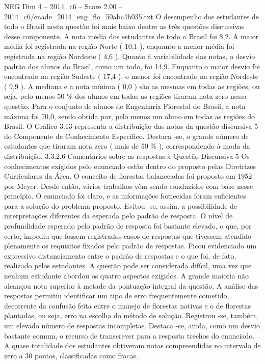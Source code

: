 \begin{textsample}{NEG Dim 4 – 2014\_c6 – Score 2.00 – 2014\_c6/enade\_2014\_eng\_flo\_50abc4b035.txt}
O desempenho dos estudantes de todo o Brasil nesta questão foi mais baixo dentre as três questões discursivas desse componente.
A nota média dos estudantes de todo o Brasil foi 8,2.
A maior média foi registrada na região Norte ( 10,1 ), enquanto a menor média foi registrada na região Nordeste ( 4,6 ).
Quanto à variabilidade das notas, o desvio padrão dos alunos do Brasil, como um todo, foi 14,9.
Enquanto o maior desvio foi encontrado na região Sudeste ( 17,4 ), o menor foi encontrado na região Nordeste ( 9,9 ).
A mediana e a nota mínima ( 0,0 ) são as mesmas em todas as regiões, ou seja, pelo menos 50 \% dos alunos em todas as regiões tiraram nota zero nessa questão.
Para o conjunto de alunos de Engenharia Florestal do Brasil, a nota máxima foi 70,0, sendo obtida por, pelo menos um aluno em todas as regiões do Brasil.
O Gráfico 3.13 representa a distribuição das notas da questão discursiva 5 do Componente de Conhecimento Específico.
Destaca -se, o grande número de estudantes que tiraram nota zero ( mais de 50 \% ), correspondendo à moda da distribuição. 3.3.2.6 Comentários sobre as respostas à Questão Discursiva 5 Os conhecimentos exigidos pelo enunciado estão dentro do proposto pelas Diretrizes Curriculares da Área.
O conceito de florestas balanceadas foi proposto em 1952 por Meyer.
Desde então, vários trabalhos vêm sendo conduzidos com base nesse princípio.
O enunciado foi claro, e as informações fornecidas foram suficientes para a solução do problema proposto.
Evitou -se, assim, a possibilidade de interpretações diferentes da esperada pelo padrão de resposta.
O nível de profundidade esperado pelo padrão de resposta foi bastante elevado, o que, por certo, impediu que fossem registrados casos de respostas que tivessem atendido plenamente os requisitos fixados pelo padrão de respostas.
Ficou evidenciado um expressivo distanciamento entre o padrão de respostas e o que foi, de fato, realizado pelos estudantes.
A questão pode ser considerada difícil, uma vez que nenhum estudante abordou os quatro aspectos exigidos.
A grande maioria não alcançou nota superior à metade da pontuação integral da questão.
A análise das respostas permitiu identificar um tipo de erro frequentemente cometido, decorrente da confusão feita entre o manejo de florestas nativas e o de florestas plantadas, ou seja, erro na escolha do método de solução.
Registrou -se, também, um elevado número de respostas incompletas.
Destaca -se, ainda, como um desvio bastante comum, o recurso de transcrever para a resposta trechos do enunciado.
A quase totalidade dos estudantes obtiveram notas compreendidas no intervalo de zero a 30 pontos, classificadas como fracas.

\end{textsample}
